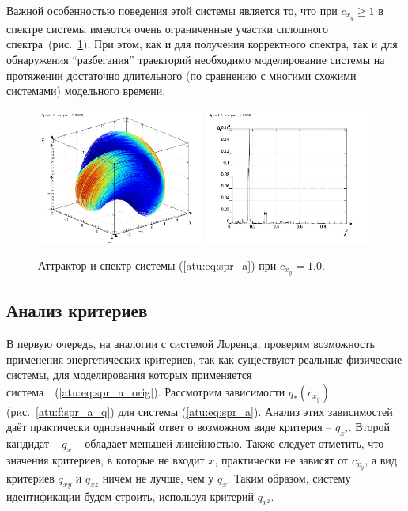 Важной особенностью поведения этой системы является то, что при $ c_{x_y} \ge 1 $
в спектре системы имеются очень ограниченные участки сплошного спектра~(рис.~\ref{atu:f:spr_a_p_1000}).
При этом, как и для получения корректного спектра, так и для обнаружения ``разбегания'' траекторий
необходимо моделирование системы на протяжении достаточно длительного
(по сравнению с многими схожими системами) модельного времени.

\begin{figure}[htb!]
\centerline{
  \includegraphics[width=0.49\textwidth]{p/cha/spr_a/sprott_a-p_xyz_cx_y=1x000.png}
  \includegraphics[width=0.49\textwidth]{p/cha/spr_a/sprott_a_f-p_f_cx_y=1x000.png}
}
\caption{Аттрактор и спектр системы (\ref{atu:eq:spr_a}) при $ c_{x_y} =1.0 $.
}
\label{atu:f:spr_a_p_1000}
\end{figure}

\subsection{Анализ критериев}

В первую очередь, на аналогии с системой Лоренца,
проверим возможность применения энергетических критериев,
так как существуют реальные физические системы,
для моделирования которых применяется система~~(\ref{atu:eq:spr_a_orig}).
Рассмотрим зависимости $q_{*}(c_{x_y}) $ (рис.~\ref{atu:f:spr_a_q})
для системы (\ref{atu:eq:spr_a}). Анализ этих зависимостей
даёт практически однозначный ответ о возможном виде критерия -- $q_{x^2}$.
Второй кандидат -- $q_{x}$ -- обладает меньшей линейностью.
Также следует отметить, что
значения критериев, в которые не входит $x$, практически не зависят от $c_{x_y}$,
а вид критериев $q_{xy}$ и $q_{xz}$ ничем не лучше, чем у $q_{x}$.
Таким образом, систему идентификации будем строить, используя критерий  $q_{x^2}$.


